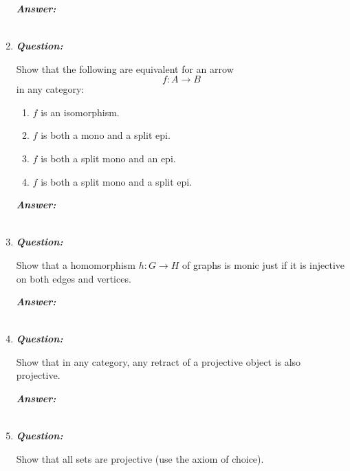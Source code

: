\documentclass{article}
\begin{document}
\begin{enumerate}
	      \textbf{\textit{Answer:}}

	      \begin{align*}
	      \end{align*}


	\item
	      \textbf{\textit{Question:}}

	      Show that the following are equivalent for an arrow
	      \[
		      f : A \to B
	      \]
	      in any category:
	      \begin{enumerate}
		      \item $ f $ is an isomorphism.
		      \item $ f $ is both a mono and a split epi.
		      \item $ f $ is both a split mono and an epi.
		      \item $ f $ is both a split mono and a split epi.
	      \end{enumerate}

	      \textbf{\textit{Answer:}}

	      \begin{align*}
	      \end{align*}


	\item
	      \textbf{\textit{Question:}}

	      Show that a homomorphism $ h : G \to H $ of graphs is monic just if it is injective on both edges and vertices.

	      \textbf{\textit{Answer:}}

	      \begin{align*}
	      \end{align*}


	\item
	      \textbf{\textit{Question:}}

	      Show that in any category, any retract of a projective object is also projective.

	      \textbf{\textit{Answer:}}

	      \begin{align*}
	      \end{align*}


	\item
	      \textbf{\textit{Question:}}

	      Show that all sets are projective (use the axiom of choice).


\end{enumerate}
\end{document}
